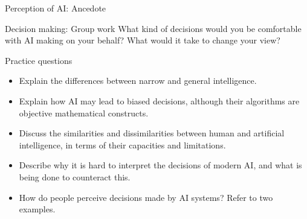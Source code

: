 \documentclass[8pt]{beamer}
\begin{document}
	\begin{frame}{Perception of AI: Ancedote}
		\centering
	\end{frame}

	\begin{frame}{Decision making: Group work}
		What kind of decisions would you be comfortable with AI making on your behalf? What would it take to change your view?
	\end{frame}

	\begin{frame}{Practice questions}
		\begin{itemize}
			\item Explain the differences between narrow and general intelligence.
			\item Explain how AI may lead to biased decisions, although their algorithms are objective mathematical constructs.
			\item Discuss the similarities and dissimilarities between human and artificial intelligence, in terms of their capacities and limitations.
			\item Describe why it is hard to interpret the decisions of modern AI, and what is being done to counteract this.
			\item How do people perceive decisions made by AI systems? Refer to two examples.
		\end{itemize}
	\end{frame}
\end{document}
